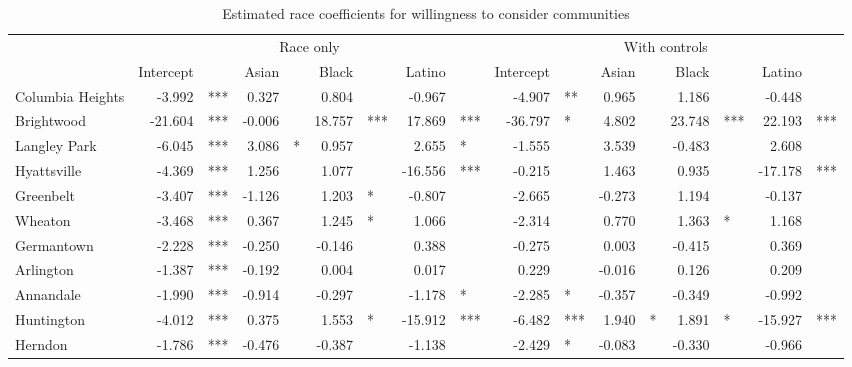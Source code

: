 % 
\begin{sidewaystable}[ht]
\centering
\caption{Estimated race coefficients for willingness to consider communities} 
\label{tab:consider}
\begin{tabular}{lrlrlrlrlrlrlrlrl}
  \toprule
  & \multicolumn{8}{c}{Race only} & \multicolumn{8}{c}{With controls}\\
 & Intercept && Asian && Black && Latino&& Intercept && Asian && Black && Latino&\\
 \midrule
Columbia Heights & -3.992 & *** & 0.327 &  & 0.804 &  & -0.967 &  & -4.907 & ** & 0.965 &  & 1.186 &  & -0.448 &  \\ 
  Brightwood & -21.604 & *** & -0.006 &  & 18.757 & *** & 17.869 & *** & -36.797 & * & 4.802 &  & 23.748 & *** & 22.193 & *** \\ 
  Langley Park & -6.045 & *** & 3.086 & * & 0.957 &  & 2.655 & * & -1.555 &  & 3.539 &  & -0.483 &  & 2.608 &  \\ 
  Hyattsville & -4.369 & *** & 1.256 &  & 1.077 &  & -16.556 & *** & -0.215 &  & 1.463 &  & 0.935 &  & -17.178 & *** \\ 
  Greenbelt & -3.407 & *** & -1.126 &  & 1.203 & * & -0.807 &  & -2.665 &  & -0.273 &  & 1.194 &  & -0.137 &  \\ 
  Wheaton & -3.468 & *** & 0.367 &  & 1.245 & * & 1.066 &  & -2.314 &  & 0.770 &  & 1.363 & * & 1.168 &  \\ 
  Germantown & -2.228 & *** & -0.250 &  & -0.146 &  & 0.388 &  & -0.275 &  & 0.003 &  & -0.415 &  & 0.369 &  \\ 
  Arlington & -1.387 & *** & -0.192 &  & 0.004 &  & 0.017 &  & 0.229 &  & -0.016 &  & 0.126 &  & 0.209 &  \\ 
  Annandale & -1.990 & *** & -0.914 &  & -0.297 &  & -1.178 & * & -2.285 & * & -0.357 &  & -0.349 &  & -0.992 &  \\ 
  Huntington & -4.012 & *** & 0.375 &  & 1.553 & * & -15.912 & *** & -6.482 & *** & 1.940 & * & 1.891 & * & -15.927 & *** \\ 
  Herndon & -1.786 & *** & -0.476 &  & -0.387 &  & -1.138 &  & -2.429 & * & -0.083 &  & -0.330 &  & -0.966 &  \\ 
   \bottomrule
\end{tabular}
\end{sidewaystable}

